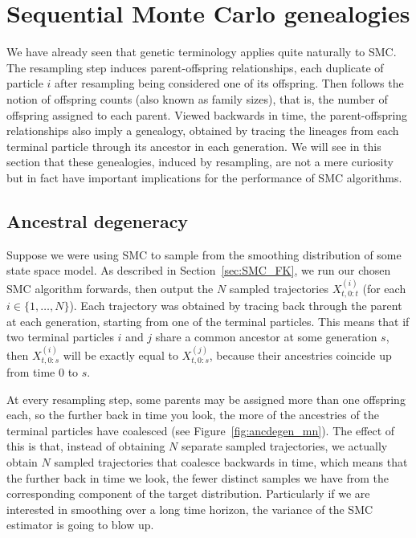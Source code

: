 \section{Sequential Monte Carlo genealogies \seb{$\checkmark$} }
\label{sec:SMC_genealogies}
We have already seen that genetic terminology applies quite naturally to SMC.
The resampling step induces parent-offspring relationships, each duplicate of particle $i$ after resampling being considered one of its offspring. Then follows the notion of offspring counts (also known as family sizes), that is, the number of offspring assigned to each parent.
Viewed backwards in time, the parent-offspring relationships also imply a genealogy, obtained by tracing the lineages from each terminal particle through its ancestor in each generation.
We will see in this section that these genealogies, induced by resampling, are not a mere curiosity but in fact have important implications for the performance of SMC algorithms.




\subsection{Ancestral degeneracy}
Suppose we were using SMC to sample from the smoothing distribution of some state space model.
As described in Section~\ref{sec:SMC_FK}, we run our chosen SMC algorithm forwards, then output the $N$ sampled trajectories $X_{t,0:t}^{(i)}$ (for each $i\in\{1,\dots,N\}$).
Each trajectory was obtained by tracing back through the parent at each generation, starting from one of the terminal particles. 
This means that if two terminal particles $i$ and $j$ share a common ancestor at some generation $s$, then $X_{t,0:s}^{(i)}$ will be exactly equal to $X_{t,0:s}^{(j)}$, because their ancestries coincide up from time $0$ to $s$.

At every resampling step, some parents may be assigned more than one offspring each, so the further back in time you look, the more of the ancestries of the terminal particles have coalesced (see Figure~\ref{fig:ancdegen_mn}).
The effect of this is that, instead of obtaining $N$ separate sampled trajectories, we actually obtain $N$ sampled trajectories that coalesce backwards in time, which means that the further back in time we look, the fewer distinct samples we have from the corresponding component of the target distribution.
Particularly if we are interested in smoothing over a long time horizon, the variance of the SMC estimator is going to blow up.

